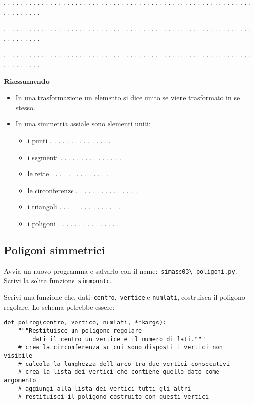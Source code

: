 . . . . . . . . . . . . . . . . . . . . . . . . . . . . . . . . . . . . . . . .
. . . . . . . . . . . . . . . . . . . . . . . . . . . .

. . . . . . . . . . . . . . . . . . . . . . . . . . . . . . . . . . . . . . . .
. . . . . . . . . . . . . . . . . . . . . . . . . . . .

. . . . . . . . . . . . . . . . . . . . . . . . . . . . . . . . . . . . . . . .
. . . . . . . . . . . . . . . . . . . . . . . . . . . .

\textbf{Riassumendo}

\begin{itemize} [noitemsep]
\item In una trasformazione un elemento si dice unito se viene trasformato in se
stesso.
\item In una simmetria assiale sono elementi uniti:
\begin{itemize} [noitemsep]
\item i punti . . . . . . . . . . . . . . .
\item i segmenti . . . . . . . . . . . . . . .
\item le rette . . . . . . . . . . . . . . .
\item le circonferenze . . . . . . . . . . . . . . .
\item i triangoli . . . . . . . . . . . . . . .
\item i poligoni . . . . . . . . . . . . . . .
\end{itemize}
\end{itemize}


\subsection{Poligoni simmetrici}

Avvia un nuovo programma e salvarlo con il 
nome:~\lstinline{simass03\_poligoni.py}.
Scrivi la solita funzione~\lstinline{simmpunto}.

Scrivi una funzione che, dati~\lstinline{centro},~\lstinline{vertice} e 
\texttt{numlati},
costruisca il poligono regolare. Lo schema potrebbe essere:

\begin{lstlisting}
def polreg(centro, vertice, numlati, **kargs):
    """Restituisce un poligono regolare 
        dati il centro un vertice e il numero di lati."""
    # crea la circonferenza su cui sono disposti i vertici non visibile
    # calcola la lunghezza dell'arco tra due vertici consecutivi
    # crea la lista dei vertici che contiene quello dato come argomento
    # aggiungi alla lista dei vertici tutti gli altri
    # restituisci il poligono costruito con questi vertici
\end{lstlisting}

